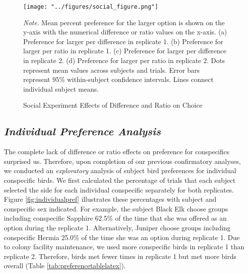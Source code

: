 \documentclass[
  ,pub,floatsintext]{apa6}
\begin{document}
\begin{figure}[h]
\caption{\newline Social Experiment Effects of Difference and Ratio on Choice \label{fig:socialgraphs}}
\begin{center}
\texttt{[image: "../figures/social\_figure.png"]}
\end{center}

\textit{Note.} Mean percent preference for the larger option is shown on the y-axis with the numerical difference or ratio values on the x-axis. (a) Preference for larger per difference in replicate 1.  (b) Preference for larger per ratio in replicate 1. (c) Preference for larger per difference in replicate 2. (d) Preference for larger per ratio in replicate 2. Dots represent mean values across subjects and trials. Error bars represent 95\% within-subject confidence intervals. Lines connect individual subject means.
\end{figure}

\clearpage

\hypertarget{individual-preference-analysis}{%
\subsection{\texorpdfstring{\emph{Individual Preference Analysis}}{Individual Preference Analysis}}\label{individual-preference-analysis}}

The complete lack of difference or ratio effects on preference for conspecifics surprised us. Therefore, upon completion of our previous confirmatory analyses, we conducted an \emph{exploratory} analysis of subject bird preferences for individual conspecific birds. We first calculated the percentage of trials that each subject selected the side for each individual conspecific separately for both replicates. Figure \ref{fig:individualpref} illustrates these percentages with subject and conspecific sex indicated. For example, the subject Black Elk choose groups including conspecific Sapphire 62.5\% of the time that she was offered as an option during the replicate 1. Alternatively, Juniper choose groups including conspecific Hermia 25.0\% of the time she was an option during replicate 1. Due to colony facility maintenance, we used more conspecific birds in replicate 1 than replicate 2. Therefore, birds met fewer times in replicate 1 but met more birds overall (Table \ref{tab:preferencetablelatex}).
\end{document}
